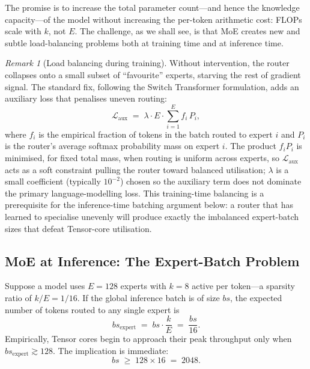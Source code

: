 \documentclass[11pt,a4paper]{article}
\theoremstyle{definition}
\theoremstyle{remark}
\newtheorem*{remark}{Remark}
\theoremstyle{plain}
\begin{document}
The promise is to increase the total parameter count---and hence the
knowledge capacity---of the model without increasing the per-token
arithmetic cost: FLOPs scale with $k$, not $E$. The challenge, as we shall
see, is that MoE creates new and subtle load-balancing problems both at
training time and at inference time.

\begin{remark}[Load balancing during training]
Without intervention, the router collapses onto a small subset of
``favourite'' experts, starving the rest of gradient signal. The standard
fix, following the Switch Transformer formulation, adds an auxiliary loss
that penalises uneven routing:
\begin{equation}
  \mathcal{L}_{\text{aux}} \;=\; \lambda \cdot E \cdot \sum_{i=1}^{E} f_i \, P_i,
  \label{eq:moe-aux}
\end{equation}
where $f_i$ is the empirical fraction of tokens in the batch routed to
expert $i$ and $P_i$ is the router's average softmax probability mass on
expert $i$. The product $f_i P_i$ is minimised, for fixed total mass, when
routing is uniform across experts, so $\mathcal{L}_{\text{aux}}$ acts as a
soft constraint pulling the router toward balanced utilisation; $\lambda$
is a small coefficient (typically $10^{-2}$) chosen so the auxiliary term
does not dominate the primary language-modelling loss. This training-time
balancing is a prerequisite for the inference-time batching argument
below: a router that has learned to specialise unevenly will produce
exactly the imbalanced expert-batch sizes that defeat Tensor-core
utilisation.
\end{remark}

\subsection{MoE at Inference: The Expert-Batch Problem}

Suppose a model uses $E = 128$ experts with $k = 8$ active per token---a
sparsity ratio of $k/E = 1/16$. If the global inference batch is of size
$bs$, the expected number of tokens routed to any single expert is
\begin{equation}
  bs_{\text{expert}} \;=\; bs \cdot \frac{k}{E} \;=\; \frac{bs}{16}.
\end{equation}
Empirically, Tensor cores begin to approach their peak throughput only
when $bs_{\text{expert}} \gtrsim 128$. The implication is immediate:
\begin{equation}
  bs \;\geq\; 128 \times 16 \;=\; 2048.
\end{equation}
\end{document}
